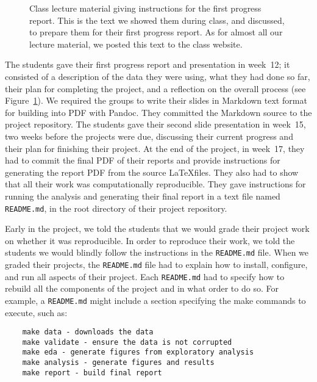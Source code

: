 \begin{figure}
\centering
\begin{tiny}

\end{tiny}
\caption{Class lecture material giving instructions for the first progress
    report.  This is the text we showed them during class, and discussed, to
    prepare them for their first progress report.  As for almost all our
    lecture material, we posted this text to the class website.}
\label{fig:progress}
\end{figure}


The students gave their first progress report and presentation in week~12;
it consisted of a description of the data they were using, what they had done
so far, their plan for completing the project, and a reflection on the overall
process (see Figure~\ref{fig:progress}).
We required the groups to write their slides in Markdown text format for
building into PDF with Pandoc.  They committed the Markdown source to the
project repository.
The students gave their second slide presentation in week~15, two weeks before
the projects were due, discussing their current progress and their plan for
finishing their project.
At the end of the project, in week~17, they had to commit the final PDF of
their reports and provide instructions for generating the report PDF
from the source \LaTeX files.
They also had to show that all their work was computationally reproducible.
They gave instructions for running the analysis and generating their final
report in a text file named \texttt{README.md}, in the root directory of their
project repository.

Early in the project, we told the students that we would grade their project
work on whether it was reproducible.  In order to reproduce their work, we
told the students we would blindly follow the instructions in the
\texttt{README.md} file.
When we graded their projects, the \texttt{README.md} file had to explain how
to install, configure, and run all aspects of their project.
Each \texttt{README.md} had to specify how to rebuild all the components of
the project and in what order to do so.
For example, a \texttt{README.md} might include a section specifying
the make commands to execute, such as:
\begin{verbatim}
    make data - downloads the data 
    make validate - ensure the data is not corrupted
    make eda - generate figures from exploratory analysis
    make analysis - generate figures and results
    make report - build final report
\end{verbatim}

